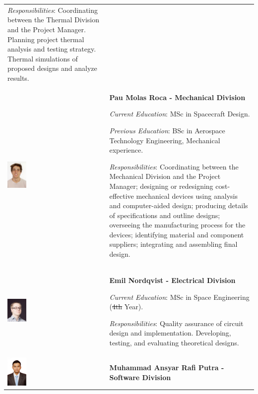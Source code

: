 \documentclass[a4paper,12pt,oneside]{article} %
\providecommand{\DIFaddtex}[1]{{\protect\color{blue}\uwave{#1}}} %
\providecommand{\DIFdeltex}[1]{{\protect\color{red}\sout{#1}}}                      %
\providecommand{\DIFaddbegin}{} %
\providecommand{\DIFaddend}{} %
\providecommand{\DIFdelbegin}{} %
\providecommand{\DIFdelend}{} %
\providecommand{\DIFadd}[1]{\texorpdfstring{\DIFaddtex{#1}}{#1}} %
\providecommand{\DIFdel}[1]{\texorpdfstring{\DIFdeltex{#1}}{}} %
\newcommand{\DIFscaledelfig}{0.5}
\newlength{\DIFdelgraphicswidth} %
\newlength{\DIFdelgraphicsheight} %
\newcommand{\DIFaddincludegraphics}[2][]{{\color{blue}\fbox{\DIFOincludegraphics[#1]{#2}}}} %
\newcommand{\DIFdelincludegraphics}[2][]{%
\sbox{\DIFdelgraphicsbox}{\DIFOincludegraphics[#1]{#2}}%
\settoboxwidth{\DIFdelgraphicswidth}{\DIFdelgraphicsbox} %
\settoboxtotalheight{\DIFdelgraphicsheight}{\DIFdelgraphicsbox} %
\scalebox{\DIFscaledelfig}{%
\parbox[b]{\DIFdelgraphicswidth}{\usebox{\DIFdelgraphicsbox}\\[-\baselineskip] \rule{\DIFdelgraphicswidth}{0em}}\llap{\resizebox{\DIFdelgraphicswidth}{\DIFdelgraphicsheight}{%
\setlength{\unitlength}{\DIFdelgraphicswidth}%
\begin{picture}(1,1)%
\thicklines\linethickness{2pt} %
{\color[rgb]{1,0,0}\put(0,0){\framebox(1,1){}}}%
{\color[rgb]{1,0,0}\put(0,0){\line( 1,1){1}}}%
{\color[rgb]{1,0,0}\put(0,1){\line(1,-1){1}}}%
\end{picture}%
}\hspace*{3pt}}} %
} %
\DeclareRobustCommand{\DIFaddbegin}{\DIFOaddbegin \let\includegraphics\DIFaddincludegraphics} %
\DeclareRobustCommand{\DIFaddend}{\DIFOaddend \let\includegraphics\DIFOincludegraphics} %
\DeclareRobustCommand{\DIFdelbegin}{\DIFOdelbegin \let\includegraphics\DIFdelincludegraphics} %
\DeclareRobustCommand{\DIFdelend}{\DIFOaddend \let\includegraphics\DIFOincludegraphics} %
\begin{document}
\begin{longtable}[]{m{} m{}}
\smallskip
\textit{Responsibilities}: Coordinating between the Thermal Division and the Project Manager. Planning project thermal analysis and testing strategy. Thermal simulations of proposed designs and analyze results.
\bigskip
\\


\includegraphics[width=0.2\textwidth]{1-introduction/img/pau-molas-roca.jpg} & \textbf{Pau Molas Roca - Mechanical Division}

\smallskip
\textit{Current Education}: MSc in Spacecraft Design.

\smallskip
\textit{Previous Education}: BSc in Aerospace Technology Engineering, Mechanical experience.

\smallskip
\textit{Responsibilities}: Coordinating between the Mechanical Division and the Project Manager; designing or redesigning cost-effective mechanical devices using analysis and computer-aided design; producing details of specifications and outline designs; overseeing the manufacturing process for the devices; identifying material and component suppliers; integrating and assembling final design.   \bigskip
\\


\includegraphics[width=0.2\textwidth]{1-introduction/img/emil-nordqvist.jpg} & \textbf{Emil Nordqvist - Electrical Division}

\smallskip
\textit{Current Education}: MSc in Space Engineering (\DIFdelbegin \DIFdel{4th }\DIFdelend \DIFaddbegin \DIFadd{5th }\DIFaddend Year).

\smallskip
\textit{Responsibilities}: Quality assurance of circuit design and implementation. Developing, testing, and evaluating theoretical designs.  \bigskip
\\

\includegraphics[width=0.2\textwidth]{1-introduction/img/muhammad-ansyar-rafi-putra.jpg} & \textbf{Muhammad Ansyar Rafi Putra - Software Division}


\end{longtable}
\end{document}

